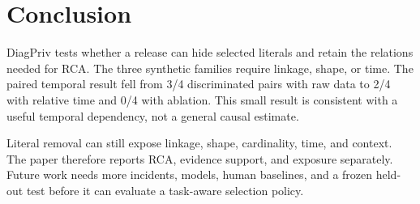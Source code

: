 \section{Conclusion}
DiagPriv tests whether a release can hide selected literals and retain the
relations needed for RCA. The three synthetic families require linkage,
shape, or time. The paired temporal result fell from 3/4 discriminated pairs
with raw data to 2/4 with relative time and 0/4 with ablation. This small
result is consistent with a useful temporal dependency, not a general causal
estimate.

Literal removal can still expose linkage, shape, cardinality, time, and
context. The paper therefore reports RCA, evidence support, and exposure
separately. Future work needs more incidents, models, human baselines, and a
frozen held-out test before it can evaluate a task-aware selection policy.
